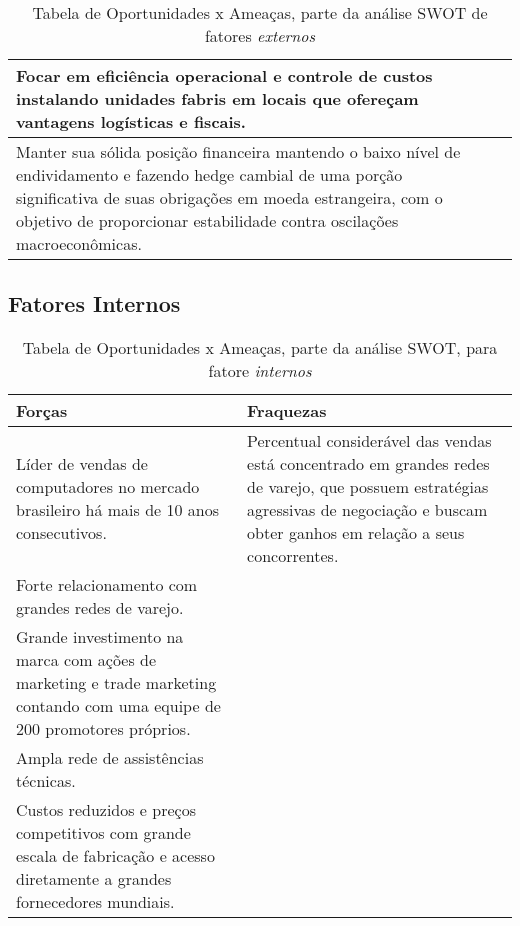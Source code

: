 {{{{\begin{center}
\begin{table}[H]
\begin{centering}
\begin{tabular}{>{\centering}p{}|>{\centering}p{}}
\hline 
Focar em eficiência operacional e controle de custos instalando unidades
fabris em locais que ofereçam vantagens logísticas e fiscais.  & \tabularnewline
\hline 
Manter sua sólida posição financeira mantendo o baixo nível de endividamento
e fazendo hedge cambial de uma porção significativa de suas obrigações
em moeda estrangeira, com o objetivo de proporcionar estabilidade
contra oscilações macroeconômicas.  & \tabularnewline
\hline 
\end{tabular}
\par\end{centering}
\caption{Tabela de Oportunidades x Ameaças, parte da análise SWOT de fatores \emph{externos}}
\end{table}
\par\end{center}

\subsection {Fatores Internos}

\begin{center}
\begin{table}[H]
\begin{centering}
\begin{tabular}{>{\centering}p{}|>{\centering}p{}}
\hline
Forças & Fraquezas\tabularnewline
\hline
Líder de vendas de computadores no mercado brasileiro há mais de 10
anos consecutivos.  & Percentual considerável das vendas está concentrado em grandes redes
de varejo, que possuem estratégias agressivas de negociação e buscam
obter ganhos em relação a seus concorrentes.\tabularnewline
\hline
Forte relacionamento com grandes redes de varejo.  & \tabularnewline
\hline
Grande investimento na marca com ações de marketing e trade marketing
contando com uma equipe de 200 promotores próprios.  & \tabularnewline
\hline
Ampla rede de assistências técnicas.  & \tabularnewline
\hline
Custos reduzidos e preços competitivos com grande escala de fabricação
e acesso diretamente a grandes fornecedores mundiais.  & \tabularnewline
\hline
\end{tabular}
\par\end{centering}
\caption{Tabela de Oportunidades x Ameaças, parte da análise SWOT, para fatore
\emph{internos}}
\end{table}
\par\end{center}

}}}}
